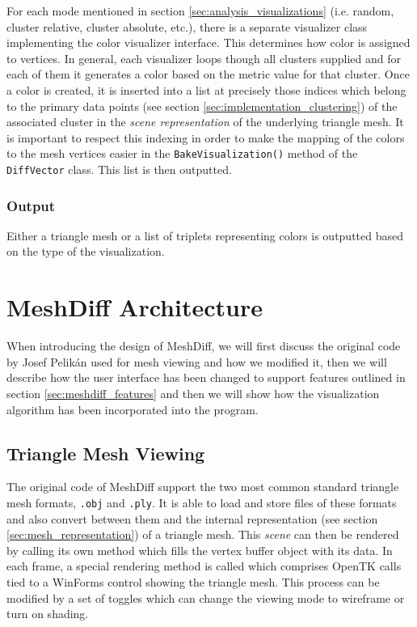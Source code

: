 For each mode mentioned in section \ref{sec:analysis_visualizations} (i.e. random, cluster relative, cluster absolute, etc.), there is a separate visualizer class implementing the color visualizer interface. This determines how color is assigned to vertices. In general, each visualizer loops though all clusters supplied and for each of them it generates a color based on the metric value for that cluster. Once a color is created, it is inserted into a list at precisely those indices which belong to the primary data points (see section \ref{sec:implementation_clustering}) of the associated cluster in the {\it scene representation} of the underlying triangle mesh. It is important to respect this indexing in order to make the mapping of the colors to the mesh vertices easier in the \verb+BakeVisualization()+ method of the \verb+DiffVector+ class. This list is then outputted.

\subsubsection{Output}

Either a triangle mesh or a list of triplets representing colors is outputted based on the type of the visualization.
\section{MeshDiff Architecture}

When introducing the design of MeshDiff, we will first discuss the original code by Josef Pelikán used for mesh viewing and how we modified it, then we will describe how the user interface has been changed to support features outlined in section \ref{sec:meshdiff_features} and then we will show how the visualization algorithm has been incorporated into the program.

\subsection{Triangle Mesh Viewing}

The original code of MeshDiff support the two most common standard triangle mesh formats, \verb+.obj+ and \verb+.ply+. It is able to load and store files of these formats and also convert between them and the internal representation (see section \ref{sec:mesh_representation}) of a triangle mesh. This {\it scene} can then be rendered by calling its own method which fills the vertex buffer object with its data. In each frame, a special rendering method is called which comprises OpenTK calls tied to a WinForms control showing the triangle mesh. This process can be modified by a set of toggles which can change the viewing mode to wireframe or turn on shading.

